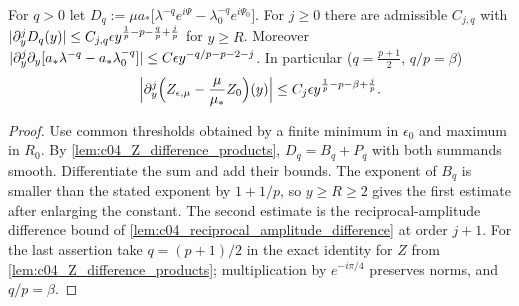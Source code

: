 \begin{lemma}
  \label{lem:c04_Z_difference}
  For $q>0$ let $D_q:=\mu a_*\bigl[\lambda^{-q}e^{i\Psi}-\lambda_0^{-q}e^{i\Psi_0}\bigr]$. For $j\ge0$ there are admissible $C_{j,q}$ with
  $|\partial_y^jD_q(y)|\le C_{j,q}\epsilon y^{\frac1p-p-\frac qp+\frac jp}$ for $y\ge R$. Moreover
  $|\partial_y^j\partial_y[a_*\lambda^{-q}-a_*\lambda_0^{-q}]|\le C\epsilon y^{-q/p-p-2-j}$. In particular ($q=\frac{p+1}2$, $q/p=\beta$)
  \begin{equation}\label{eqn:approx_Z_difference}
    \Bigl|\partial^j_y\Bigl(Z_{\epsilon,\mu}-\frac\mu{\mu_*}Z_0\Bigr)(y)\Bigr|\le C_j\epsilon y^{\frac1p-p-\beta+\frac jp}.
  \end{equation}
\end{lemma}
\begin{proof}
  Use common thresholds obtained by a finite minimum in $\epsilon_0$ and maximum in $R_0$.
  By \cref{lem:c04_Z_difference_products}, $D_q=B_q+P_q$ with both summands smooth.
  Differentiate the sum and add their bounds. The exponent of $B_q$ is smaller than
  the stated exponent by $1+1/p$, so $y\ge R\ge2$ gives the first estimate after
  enlarging the constant. The second estimate is the reciprocal-amplitude difference
  bound of \cref{lem:c04_reciprocal_amplitude_difference} at order $j+1$.
  For the last assertion take $q=(p+1)/2$ in the exact identity for $Z$ from
  \cref{lem:c04_Z_difference_products}; multiplication by $e^{-i\pi/4}$ preserves norms,
  and $q/p=\beta$.
\end{proof}

